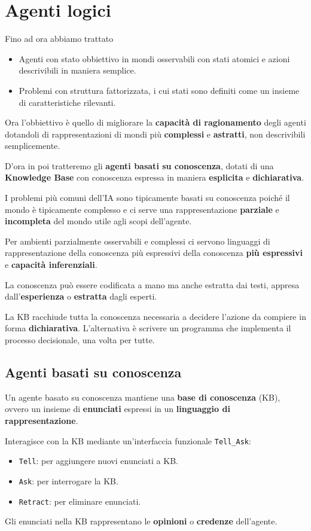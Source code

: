 \chapter{Agenti logici}
Fino ad ora abbiamo trattato
\begin{itemize}
	\item Agenti con stato obbiettivo in mondi osservabili con stati atomici e azioni
	      descrivibili in maniera semplice.
	\item Problemi con struttura fattorizzata, i cui stati sono definiti come un insieme di caratteristiche
	      rilevanti.
\end{itemize}
Ora l'obbiettivo \`e quello di migliorare la \textbf{capacit\`a di ragionamento} degli agenti dotandoli di
rappresentazioni di mondi pi\`u \textbf{complessi} e \textbf{astratti}, non descrivibili semplicemente.

D'ora in poi tratteremo gli \textbf{agenti basati su conoscenza}, dotati di una \textbf{Knowledge Base} con
conoscenza espressa in maniera \textbf{esplicita} e \textbf{dichiarativa}.

I problemi pi\`u comuni dell'IA sono tipicamente basati su conoscenza poich\'e il mondo \`e tipicamente complesso
e ci serve una rappresentazione \textbf{parziale} e \textbf{incompleta} del mondo utile agli scopi dell'agente.

Per ambienti parzialmente osservabili e complessi ci servono linguaggi di rappresentazione della conoscenza pi\`u
espressivi della conoscenza \textbf{pi\`u espressivi} e \textbf{capacit\`a inferenziali}.

La conoscenza pu\`o essere codificata a mano ma anche estratta dai testi, appresa dall'\textbf{esperienza} o
\textbf{estratta} dagli esperti.

La KB racchiude tutta la conoscenza necessaria a decidere l'azione da compiere in forma \textbf{dichiarativa}.
L'alternativa \`e scrivere un programma che implementa il processo decisionale, una volta per tutte.

\section{Agenti basati su conoscenza}
Un agente basato su conoscenza mantiene una \textbf{base di conoscenza} (KB), ovvero un insieme di
\textbf{enunciati} espressi in un \textbf{linguaggio di rappresentazione}.

Interagisce con la KB mediante un'interfaccia funzionale \verb|Tell_Ask|:
\begin{itemize}
	\item \verb|Tell|: per aggiungere nuovi enunciati a KB.
	\item \verb|Ask|: per interrogare la KB.
	\item \verb|Retract|: per eliminare enunciati.
\end{itemize}
Gli enunciati nella KB rappresentano le \textbf{opinioni} o \textbf{credenze} dell'agente.


